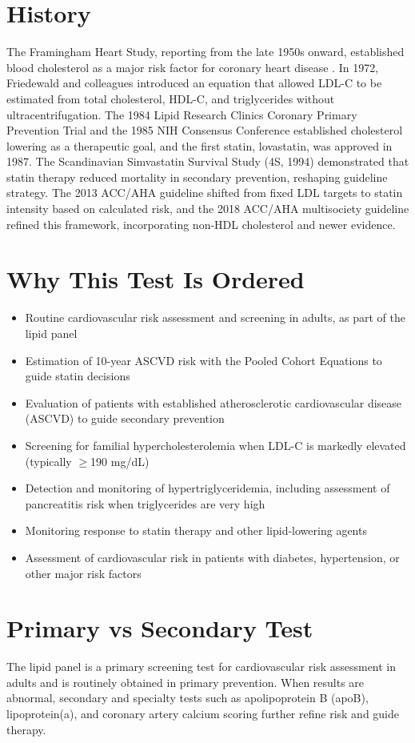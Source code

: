 \section*{History}
The Framingham Heart Study, reporting from the late 1950s onward, established blood cholesterol as a major risk factor for coronary heart disease \cite{wilson1998prediction}. In 1972, Friedewald and colleagues introduced an equation that allowed LDL-C to be estimated from total cholesterol, HDL-C, and triglycerides without ultracentrifugation. The 1984 Lipid Research Clinics Coronary Primary Prevention Trial and the 1985 NIH Consensus Conference established cholesterol lowering as a therapeutic goal, and the first statin, lovastatin, was approved in 1987. The Scandinavian Simvastatin Survival Study (4S, 1994) demonstrated that statin therapy reduced mortality in secondary prevention, reshaping guideline strategy. The 2013 ACC/AHA guideline shifted from fixed LDL targets to statin intensity based on calculated risk, and the 2018 ACC/AHA multisociety guideline refined this framework, incorporating non-HDL cholesterol and newer evidence.
\section*{Why This Test Is Ordered}
\begin{itemize}
  \item Routine cardiovascular risk assessment and screening in adults, as part of the lipid panel
  \item Estimation of 10-year ASCVD risk with the Pooled Cohort Equations to guide statin decisions
  \item Evaluation of patients with established atherosclerotic cardiovascular disease (ASCVD) to guide secondary prevention
  \item Screening for familial hypercholesterolemia when LDL-C is markedly elevated (typically $\geq$190 mg/dL)
  \item Detection and monitoring of hypertriglyceridemia, including assessment of pancreatitis risk when triglycerides are very high
  \item Monitoring response to statin therapy and other lipid-lowering agents
  \item Assessment of cardiovascular risk in patients with diabetes, hypertension, or other major risk factors
\end{itemize}
\section*{Primary vs Secondary Test}
The lipid panel is a primary screening test for cardiovascular risk assessment in adults and is routinely obtained in primary prevention. When results are abnormal, secondary and specialty tests such as apolipoprotein B (apoB), lipoprotein(a), and coronary artery calcium scoring further refine risk and guide therapy.
